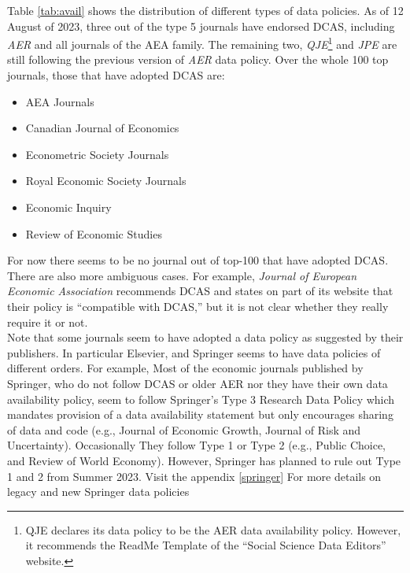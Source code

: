 \documentclass[11pt]{article}
\begin{document}
Table \ref{tab:avail} shows the distribution of different types of data policies. As of 12 August of 2023, three out of the type 5 journals have endorsed DCAS, including \textit{AER} and all journals of the AEA family. The remaining two, \textit{QJE}\footnote{QJE declares its data policy to be the AER data availability policy. However, it recommends the ReadMe Template of the ``Social Science Data Editors'' website.} and \textit{JPE} are still following the previous version of \textit{AER} data policy. Over the whole 100 top journals, those that have adopted DCAS are:
\begin{itemize}
\item AEA Journals
\item Canadian Journal of Economics
\item Econometric Society Journals
\item Royal Economic Society Journals
\item Economic Inquiry
\item Review of Economic Studies
\end{itemize}

For now there seems to be no journal out of top-100 that have adopted DCAS. There are also more ambiguous cases. For example, \textit{Journal of European Economic Association} recommends DCAS and states on part of its website that their policy is ``compatible with DCAS,'' but it is not clear whether they really require it or not.\\

Note that some journals seem to have adopted a data policy as suggested by their publishers. In particular Elsevier, and Springer seems to have data policies of different orders. For example, Most of the economic journals published by Springer, who do not follow DCAS or older AER nor they have their own data availability policy, seem to follow Springer's Type 3 Research Data Policy which mandates provision of a data availability statement but only encourages sharing of data and code (e.g., Journal of Economic Growth, Journal of Risk and Uncertainty). Occasionally They follow Type 1 or Type 2 (e.g., Public Choice, and Review of World Economy). However, Springer has planned to rule out Type 1 and 2 from Summer 2023. Visit the appendix \ref{springer} For more details on legacy and new Springer data policies\\
\end{document}
